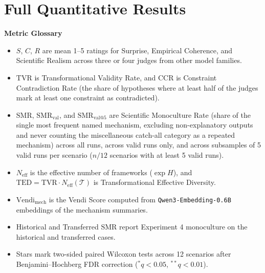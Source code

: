 \documentclass{article}
\begin{document}
\clearpage



\clearpage
\appendix
\section{Full Quantitative Results}
\label{app:tables}

\noindent\textbf{Metric Glossary}
\begin{itemize}[leftmargin=1.5em, itemsep=1pt, topsep=3pt]
\item $S$, $C$, $R$ are mean 1--5 ratings for Surprise, Empirical Coherence, and Scientific Realism across three or four judges from other model families.
\item $\mathrm{TVR}$ is Transformational Validity Rate, and $\mathrm{CCR}$ is Constraint Contradiction Rate (the share of hypotheses where at least half of the judges mark at least one constraint as contradicted).
\item $\mathrm{SMR}$, $\mathrm{SMR}_{\mathrm{val}}$, and $\mathrm{SMR}_{\mathrm{val}@5}$ are Scientific Monoculture Rate (share of the single most frequent named mechanism, excluding non-explanatory outputs and never counting the miscellaneous catch-all category as a repeated mechanism) across all runs, across valid runs only, and across subsamples of 5 valid runs per scenario ($n/12$ scenarios with at least 5 valid runs).
\item $N_{\mathrm{eff}}$ is the effective number of frameworks ($\exp H$), and $\mathrm{TED} = \mathrm{TVR}\cdot N_{\mathrm{eff}}(\mathcal{T})$ is Transformational Effective Diversity.
\item $\mathrm{Vendi}_{\mathrm{mech}}$ is the Vendi Score computed from \texttt{Qwen3-Embedding-0.6B} embeddings of the mechanism summaries.
\item Historical and Transferred $\mathrm{SMR}$ report Experiment 4 monoculture on the historical and transferred cases.
\item Stars mark two-sided paired Wilcoxon tests across 12 scenarios after Benjamini--Hochberg FDR correction ($^*q<0.05$, $^{**}q<0.01$).
\end{itemize}
\end{document}
